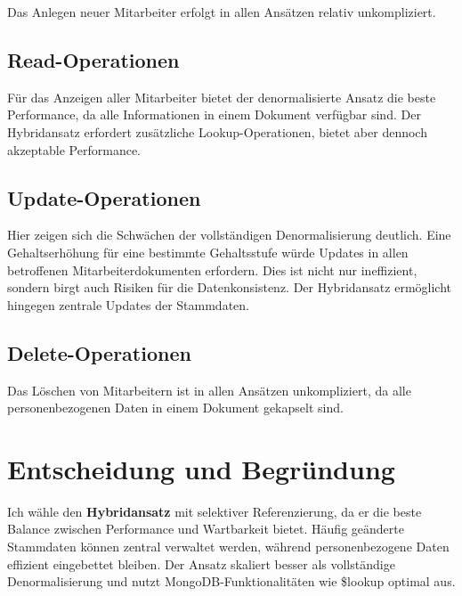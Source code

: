 \documentclass[12pt,a4paper]{article}
\begin{document}
Das Anlegen neuer Mitarbeiter erfolgt in allen Ansätzen relativ unkompliziert. 

\subsection{Read-Operationen}

Für das Anzeigen aller Mitarbeiter bietet der denormalisierte Ansatz die beste Performance, da alle Informationen in einem Dokument verfügbar sind. Der Hybridansatz erfordert zusätzliche Lookup-Operationen, bietet aber dennoch akzeptable Performance.

\subsection{Update-Operationen}

Hier zeigen sich die Schwächen der vollständigen Denormalisierung deutlich. Eine Gehaltserhöhung für eine bestimmte Gehaltsstufe würde Updates in allen betroffenen Mitarbeiterdokumenten erfordern. Dies ist nicht nur ineffizient, sondern birgt auch Risiken für die Datenkonsistenz. Der Hybridansatz ermöglicht hingegen zentrale Updates der Stammdaten.

\subsection{Delete-Operationen}

Das Löschen von Mitarbeitern ist in allen Ansätzen unkompliziert, da alle personenbezogenen Daten in einem Dokument gekapselt sind.

\section{Entscheidung und Begründung}

Ich wähle den \textbf{Hybridansatz} mit selektiver Referenzierung, da er die beste Balance zwischen Performance und Wartbarkeit bietet. Häufig geänderte Stammdaten können zentral verwaltet werden, während personenbezogene Daten effizient eingebettet bleiben. Der Ansatz skaliert besser als vollständige Denormalisierung und nutzt MongoDB-Funktionalitäten wie \$lookup optimal aus.
\end{document}
